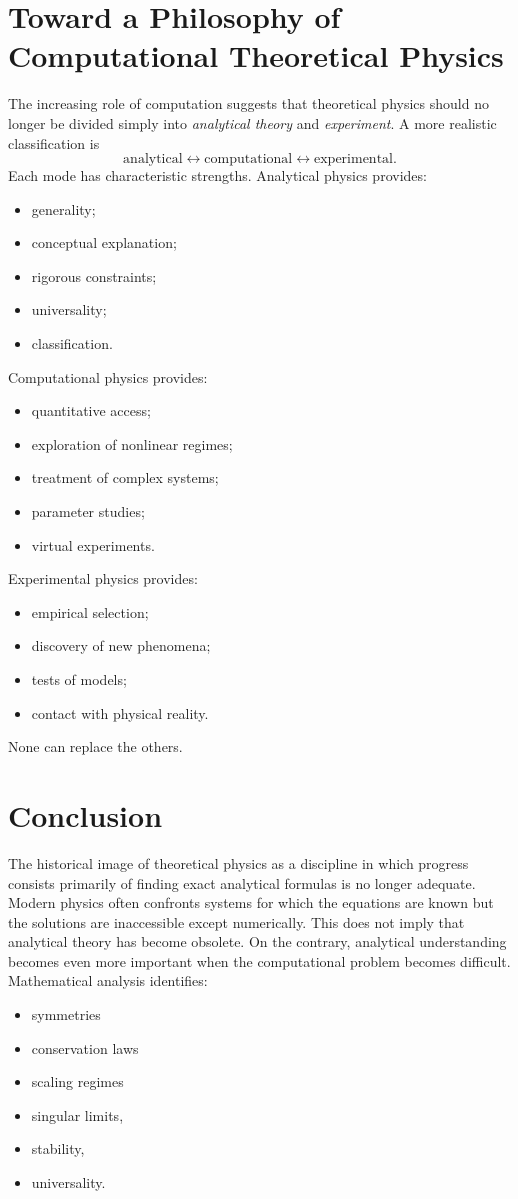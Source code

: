 \section{ Toward a Philosophy of Computational Theoretical Physics}
The increasing role of computation suggests that theoretical physics should no
longer be divided simply into
\emph{analytical theory} and \emph{experiment}.
A more realistic classification is
\[\boxed{\text{analytical}\leftrightarrow\text{computational}
\leftrightarrow\text{experimental}.}\]
Each mode has characteristic strengths.
Analytical physics provides:
\begin{itemize}
\item generality;
\item conceptual explanation;
\item rigorous constraints;
\item universality;
\item classification.
\end{itemize}
Computational physics provides:
\begin{itemize}
\item quantitative access;
\item exploration of nonlinear regimes;
\item treatment of complex systems;
\item parameter studies;
\item virtual experiments.
\end{itemize}
Experimental physics provides:
\begin{itemize}
\item empirical selection;
\item discovery of new phenomena;
\item tests of models;
\item contact with physical reality.
\end{itemize}
None can replace the others.

\section{ Conclusion}
The historical image of theoretical physics as a discipline in which progress
consists primarily of finding exact analytical formulas is no longer adequate.
Modern physics often confronts systems for which the equations are known but
the solutions are inaccessible except numerically. This does not imply that
analytical theory has become obsolete. On the contrary, analytical
understanding becomes even more important when the computational problem
becomes difficult.
Mathematical analysis identifies:
\begin{itemize}
   \item symmetries
   \item conservation laws
   \item scaling regimes
\item{singular limits},
\item{stability},
\item{universality}.
\end{itemize}

